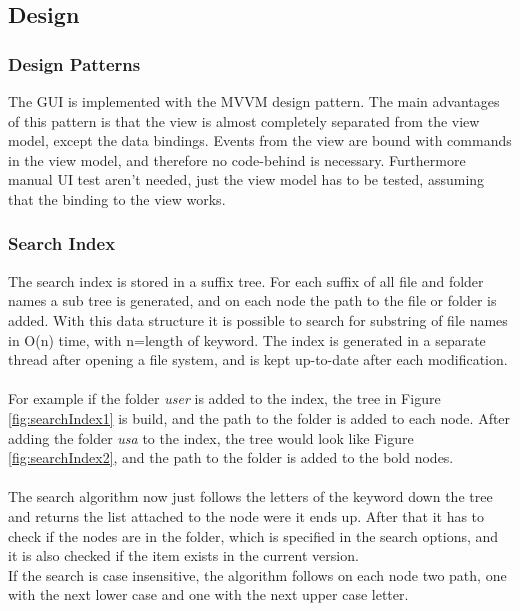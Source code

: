 \documentclass[JCDReport.tex]{subfiles}
\begin{document}
\subsection{Design}

\subsubsection{Design Patterns}
The GUI is implemented with the MVVM design pattern. The main advantages of this pattern is that the view is almost completely separated from the view model, except the data bindings. 
Events from the view are bound with commands in the view model, and therefore no code-behind is necessary. Furthermore manual UI test aren't needed, just the view model has to be tested, assuming that the binding to the view works.

\subsubsection{Search Index}
The search index is stored in a suffix tree. For each suffix of all file and folder names a sub tree is generated, and on each node the path to the file or folder is added. With this data structure it is possible to search for substring of file names in O(n) time, with n=length of keyword. 
The index is generated in a separate thread after opening a file system, and is kept up-to-date after each modification. \\
\\
For example if the folder \textit{user} is added to the index, the tree in Figure \ref{fig:searchIndex1} is build, and the path to the folder is added to each node.
After adding the folder \textit{usa} to the index, the tree would look like Figure \ref{fig:searchIndex2}, and the path to the folder is added to the bold nodes.\\
\\
The search algorithm now just follows the letters of the keyword down the tree and returns the list attached to the node were it ends up. After that it has to check if the nodes are in the folder, which is specified in the search options, and it is also checked if the item exists in the current version.\\
If the search is case insensitive, the algorithm follows on each node two path, one with the next lower case and one with the next upper case letter.
\end{document}
